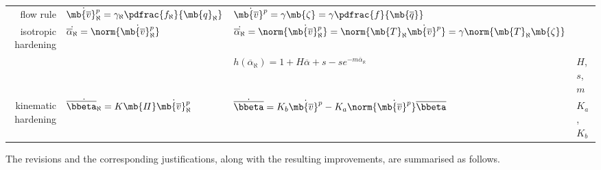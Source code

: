 \begin{table}[H]
\begin{tabular}{r|l|l|l}
              flow rule & $\dot{\mb{\overline{v}}^p_\aleph}=\gamma_\aleph\pdfrac{f_\aleph}{\mb{q}_\aleph}$ & $\dot{\mb{\overline{v}}^p}=\gamma\mb{\zeta}=\gamma\pdfrac{f}{\mb{\overline{q}}}$                                                                            &                        \\
    isotropic hardening & $\dot{\overline{\alpha}_\aleph}=\norm{\dot{\mb{\overline{v}}^p_\aleph}}$         & $\dot{\overline{\alpha}_\aleph}=\norm{\dot{\mb{\overline{v}}^p_\aleph}}=\norm{\mb{T}_\aleph\dot{\mb{\overline{v}}^p}}=\gamma\norm{\mb{T}_\aleph\mb{\zeta}}$ &                        \\
                        &                                                                                  & $h\left(\overline{\alpha}_\aleph\right)=1+H\overline{\alpha}+s-se^{-m\overline{\alpha}_\aleph}$                                                             & $H$, $s$, $m$          \\
    kinematic hardening & $\dot{\overline{\bbeta}_\aleph}=K\mb{\varPi}\dot{\mb{\overline{v}}^p_\aleph}$    & $\dot{\overline{\bbeta}}=K_b\dot{\mb{\overline{v}}^p}-K_a\norm{\dot{\mb{\overline{v}}^p}}\overline{\bbeta}$                                                 & $K_a$, $K_b$           \\ \bottomrule
\end{tabular}
\end{table}
The revisions and the corresponding justifications, along with the resulting improvements, are summarised as follows.
